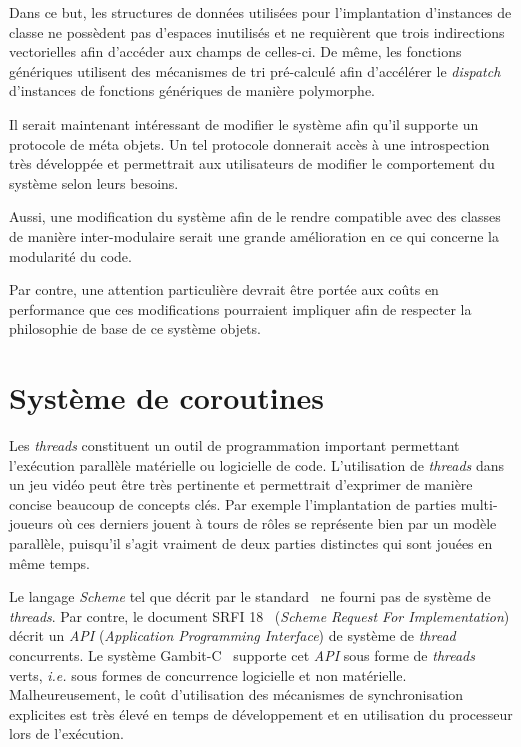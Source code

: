 \documentclass[12pt,twoside,letterpaper,francais]{book}
\newcommand{\ie}{{\textit{i.e. }}}
\newcommand{\Schemelang}{{\textit{Scheme }}}
\begin{document}
Dans ce but, les structures de données utilisées pour l'implantation
d'instances de classe ne possèdent pas d'espaces inutilisés et ne
requièrent que trois indirections vectorielles afin d'accéder aux
champs de celles-ci. De même, les fonctions génériques utilisent des
mécanismes de tri pré-calculé afin d'accélérer le \textit{dispatch}
d'instances de fonctions génériques de manière polymorphe.

Il serait maintenant intéressant de modifier le système afin qu'il
supporte un protocole de méta objets. Un tel protocole donnerait accès
à une introspection très développée et permettrait aux utilisateurs de
modifier le comportement du système selon leurs besoins.

Aussi, une modification du système afin de le rendre compatible avec
des classes de manière inter-modulaire serait une grande amélioration
en ce qui concerne la modularité du code.

Par contre, une attention particulière devrait être portée aux coûts
en performance que ces modifications pourraient impliquer afin de
respecter la philosophie de base de ce système objets.

\clearpage

\chapter{Système de coroutines} \label{Chap:corout}
Les \textit{threads} constituent un outil de programmation important
permettant l'exécution parallèle matérielle ou logicielle de
code. L'utilisation de \textit{threads} dans un jeu vidéo peut être
très pertinente et permettrait d'exprimer de manière concise beaucoup
de concepts clés. Par exemple l'implantation de parties multi-joueurs
où ces derniers jouent à tours de rôles se représente bien par un
modèle parallèle, puisqu'il s'agit vraiment de deux parties distinctes
qui sont jouées en même temps.

Le langage \Schemelang tel que décrit par le standard~\cite{R5RS} ne fourni
pas de système de \textit{threads}. Par contre, le document SRFI
18~\cite{SRFI18} (\textit{Scheme Request For Implementation}) décrit
un \textit{API} (\textit{Application Programming Interface}) de
système de \textit{thread} concurrents. Le système
Gambit-C~\cite{Gambit4} supporte cet \textit{API} sous forme de
\textit{threads} verts, \ie  sous formes de concurrence logicielle et
non matérielle. Malheureusement, le coût d'utilisation des mécanismes
de synchronisation explicites est très élevé en temps de développement
et en utilisation du processeur lors de l'exécution.
\end{document}
